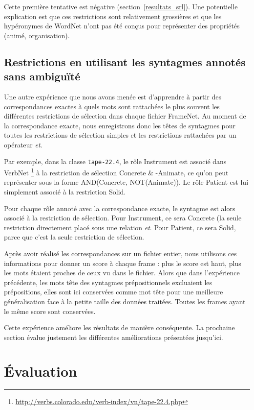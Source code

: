 Cette première tentative est négative (section~\ref{resultats_srl}). Une
potentielle explication est que ces restrictions sont relativement grossières
et que les hypéronymes de WordNet n'ont pas été conçus pour représenter des
propriétés (animé, organisation).

\subsection{Restrictions en utilisant les syntagmes annotés sans ambiguïté}
\label{restrictions_verbnet}

Une autre expérience que nous avons menée est d'apprendre à partir des
correspondances exactes à quels mots sont rattachées le plus souvent les
différentes restrictions de sélection dans chaque fichier FrameNet. Au moment
de la correspondance exacte, nous enregistrons donc les têtes de syntagmes pour
toutes les restrictions de sélection simples et les restrictions rattachées par
un opérateur \textit{et}.

Par exemple, dans la classe \texttt{tape-22.4}, le rôle Instrument est associé
dans VerbNet
\footnote{\url{http://verbs.colorado.edu/verb-index/vn/tape-22.4.php}} à la
restriction de sélection Concrete \& -Animate, ce qu'on peut représenter sous
la forme AND(Concrete, NOT(Animate)). Le rôle Patient est lui simplement
associé à la restriction Solid.

Pour chaque rôle annoté avec la correspondance exacte, le syntagme est alors
associé à la restriction de sélection. Pour Instrument, ce sera Concrete (la
seule restriction directement placé sous une relation \textit{et}. Pour Patient,
ce sera Solid, parce que c'est la seule restriction de sélection.

Après avoir réalisé les correspondances sur un fichier entier, nous utilisons
ces informations pour donner un score à chaque frame : plus le score est haut,
plus les mots étaient proches de ceux vu dans le fichier. Alors que dans
l'expérience précédente, les mots tête des syntagmes prépositionnels excluaient
les prépositions, elles sont ici conservées comme mot tête pour une meilleure
généralisation face à la petite taille des données traitées. Toutes les frames
ayant le même score sont conservées.

Cette expérience améliore les résultats de manière conséquente. La prochaine
section évalue justement les différentes améliorations présentées jusqu'ici.

\section{Évaluation}
\label{srl:evaluation}

